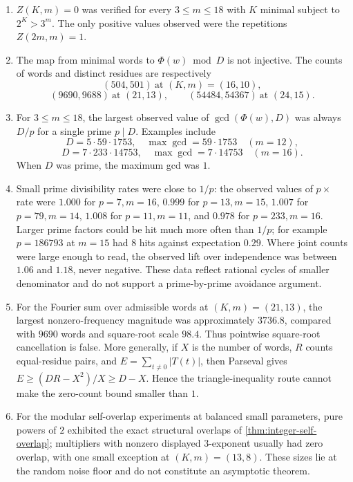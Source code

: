 \documentclass[11pt]{amsart}
\numberwithin{equation}{section}
\begin{document}
\begin{enumerate}[label=(\roman*)]
\item $Z(K,m)=0$ was verified for every $3\le m\le18$ with $K$ minimal subject to $2^K>3^m$.  The only positive values observed were the repetitions $Z(2m,m)=1$.

\item The map from minimal words to $\Phi(w)\bmod D$ is not injective.  The counts of words and distinct residues are respectively
\[
(504,501)\ \text{at }(K,m)=(16,10),
\]
\[
(9690,9688)\ \text{at }(21,13),
\qquad
(54484,54367)\ \text{at }(24,15).
\]

\item For $3\le m\le18$, the largest observed value of $\gcd(\Phi(w),D)$ was always $D/p$ for a single prime $p\mid D$.  Examples include
\[
D=5\cdot59\cdot1753,
\quad\max\gcd=59\cdot1753
\quad(m=12),
\]
\[
D=7\cdot233\cdot14753,
\quad\max\gcd=7\cdot14753
\quad(m=16).
\]
When $D$ was prime, the maximum gcd was $1$.

\item Small prime divisibility rates were close to $1/p$: the observed values of $p\times$rate were $1.000$ for $p=7,m=16$, $0.999$ for $p=13,m=15$, $1.007$ for $p=79,m=14$, $1.008$ for $p=11,m=11$, and $0.978$ for $p=233,m=16$.  Larger prime factors could be hit much more often than $1/p$; for example $p=186793$ at $m=15$ had $8$ hits against expectation $0.29$.  Where joint counts were large enough to read, the observed lift over independence was between $1.06$ and $1.18$, never negative.  These data reflect rational cycles of smaller denominator and do not support a prime-by-prime avoidance argument.

\item For the Fourier sum over admissible words at $(K,m)=(21,13)$, the largest nonzero-frequency magnitude was approximately $3736.8$, compared with $9690$ words and square-root scale $98.4$.  Thus pointwise square-root cancellation is false.  More generally, if $X$ is the number of words, $R$ counts equal-residue pairs, and $E=\sum_{t\ne0}|T(t)|$, then Parseval gives $E\ge(DR-X^2)/X\ge D-X$.  Hence the triangle-inequality route cannot make the zero-count bound smaller than $1$.

\item For the modular self-overlap experiments at balanced small parameters, pure powers of $2$ exhibited the exact structural overlaps of \cref{thm:integer-self-overlap}; multipliers with nonzero displayed $3$-exponent usually had zero overlap, with one small exception at $(K,m)=(13,8)$.  These sizes lie at the random noise floor and do not constitute an asymptotic theorem.
\end{enumerate}
\end{document}
